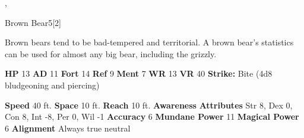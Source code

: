   ,
  \begin{monsubsection}{Brown Bear}{5}[2]
    \vspace{-1em}\vspace{-1em}
    \vspace{0em}

    
          Brown bears tend to be bad-tempered and territorial.
          A brown bear's statistics can be used for almost any big bear, including the grizzly.
        
    

    \begin{spellcontent}
      \begin{spelltargetinginfo}
        \pari \textbf{HP} 13 \monsep
          \textbf{AD} 11 \monsep
          \textbf{Fort} 14 \monsep
          \textbf{Ref} 9 \monsep
          \textbf{Ment} 7
        \pari \textbf{WR} 13 \monsep
        \textbf{VR} 40
        \pari \textbf{Strike:}
            Bite  (4d8 bludgeoning and piercing)
      \end{spelltargetinginfo}
    \end{spellcontent}
    \begin{monsterfooter}
      \pari \textbf{Speed} 40 ft. \monsep
        \textbf{Space} 10 ft. \monsep
        \textbf{Reach} 10 ft.
      \pari \textbf{Awareness} 
      \pari \textbf{Attributes}
        Str 8, Dex 0,
        Con 8, Int -8,
        Per 0, Wil -1
      \pari \textbf{Accuracy} 6 \monsep
        \textbf{Mundane Power} 11 \monsep
      \textbf{Magical Power} 6
      \pari \textbf{Alignment} Always true neutral
    \end{monsterfooter}
  \end{monsubsection}
  
  
  
